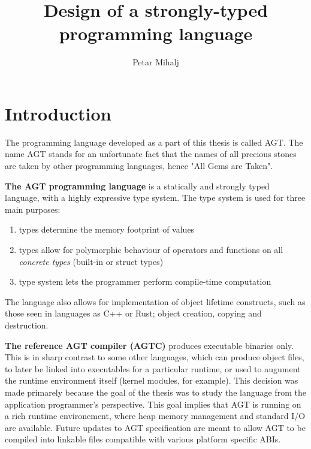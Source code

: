 \documentclass[times, utf8, diplomski]{fer}
\theoremstyle{definition}
\begin{document}

\title{Design of a strongly-typed programming language}

\author{Petar Mihalj}

\maketitle




\tableofcontents

\chapter{Introduction}\label{chap:intro}

The programming language developed as a part of this thesis is called AGT.
The name AGT stands for an unfortunate fact that the names of all precious stones
are taken by other programming languages, hence "All Gems are Taken".

\textbf{The AGT programming language} is a statically and 
strongly typed language, with a highly expressive type system.
The type system is used for three main purposes:

\begin{enumerate}
    \item types determine the memory footprint of values 
    \item types allow for polymorphic behaviour of operators and functions on all 
        \textit{concrete types} (built-in or struct types)
    \item type system lets the programmer perform compile-time computation
\end{enumerate}

The language also allows for implementation of object lifetime constructs, 
such as those seen in languages as C++ or Rust; object creation, copying and destruction.

\textbf{The reference AGT compiler (AGTC)} produces executable binaries only.
This is in sharp contrast to some other languages, which can produce object files, 
to later be linked into executables for a particular runtime, 
or used to augument the runtime environment itself (kernel modules, for example). 
This decision was made primarely because the goal of the thesis was to study the language 
from the application programmer's perspective. 
This goal implies that AGT is running on a rich runtime environement, 
where heap memory management and standard I/O are available.
Future updates to AGT specification are meant to allow AGT to be compiled
into linkable files compatible with various platform specific ABIs.
\end{document}
